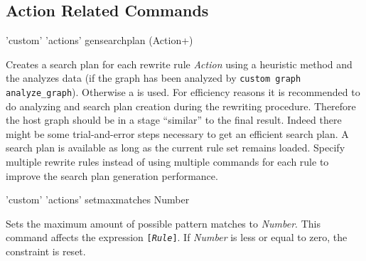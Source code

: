 \subsection{Action Related Commands}
\begin{rail}
  'custom' 'actions' gensearchplan (Action+)
\end{rail}
Creates a search plan for each rewrite rule \emph{Action} using a heuristic method and the analyzes data (if the graph has been analyzed by \texttt{custom graph analyze\_graph}). Otherwise a  is used. For efficiency reasons it is recommended to do analyzing and search plan creation during the rewriting procedure. Therefore the host graph should be in a stage ``similar'' to the final result. Indeed there might be some trial-and-error steps necessary to get an efficient search plan. A search plan is available as long as the current rule set remains loaded. 
Specify multiple rewrite rules instead of using multiple commands for each rule to improve the search plan generation performance.

\begin{rail}
  'custom' 'actions' setmaxmatches Number
\end{rail}
Sets the maximum amount of possible pattern matches to \emph{Number}. This command affects the expression \texttt{[\emph{Rule}]}. If \emph{Number} is less or equal to zero, the constraint is reset.


